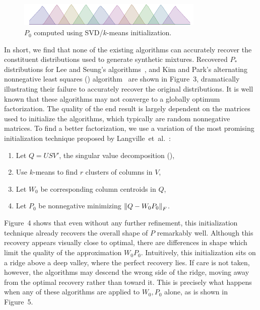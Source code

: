 \documentclass[conference]{IEEEtran}
\begin{document}
\begin{figure}[t]
\begin{center}
\includegraphics[width=3.5in]{synth/Q_ki}
\end{center}
\vspace{-0.7em}
\caption{$P_0$ computed using SVD/$k$-means initialization.}
\vspace{-1em}
\end{figure}

In short, we find that none of the existing  algorithms can accurately recover the constituent distributions used to generate synthetic mixtures.
Recovered $P_*$ distributions for Lee and Seung's algorithms~\cite{Lee01}, and Kim and Park's alternating nonnegative least squares () algorithm~\cite{Kim08} are shown in Figure~3, dramatically illustrating their failure to accurately recover the original distributions.
It is well known that these algorithms may not converge to a globally optimum factorization.
The quality of the end result is largely dependent on the matrices used to initialize the algorithms, which typically are random nonnegative matrices.
To find a better factorization, we use a variation of the most promising initialization technique proposed by Langville~et~al.~\cite{Langville06}:
\begin{enumerate}
  \item Let $Q=USV'$, the singular value decomposition (),
  \item Use $k$-means to find $r$ clusters of columns in $V$,
  \item Let $W_0$ be corresponding column centroids in $Q$,
  \item Let $P_0$ be nonnegative minimizing ${\lVert Q - W_0 P_0\rVert}_F$.
\end{enumerate}
Figure~4 shows that even without any further refinement, this initialization technique already recovers the overall shape of $P$ remarkably well.
Although this recovery appears visually close to optimal, there are differences in shape which limit the quality of the approximation $W_0 P_0$.
Intuitively, this initialization sits on a ridge above a deep valley, where the perfect recovery lies.
If care is not taken, however, the  algorithms may descend the wrong side of the ridge, moving away from the optimal recovery rather than toward it.
This is precisely what happens when any of these algorithms are applied to $W_0,P_0$ alone, as is shown in Figure~5.
\end{document}
